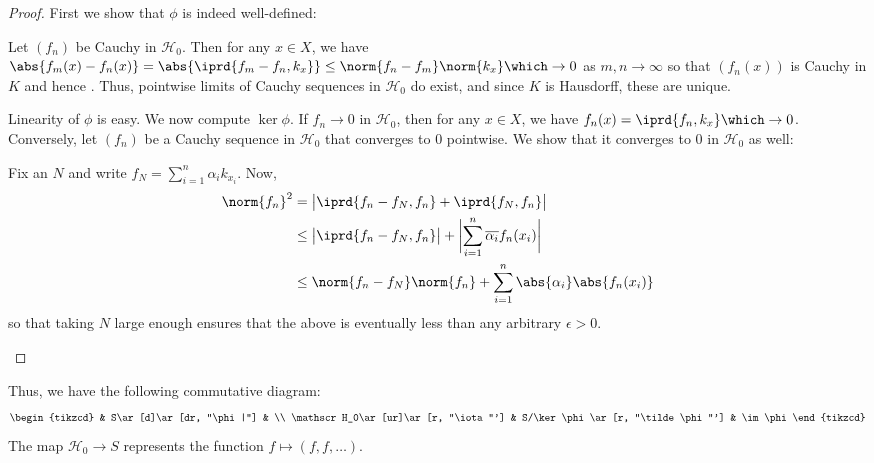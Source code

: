 	\begin{proof}
		First we show that $\phi$ is indeed well-defined:
		\begin{subproof}
			Let $(f_n)$ be Cauchy in $\mathscr H_0$. Then for any $x\in X$, we have $\abs{ f_m(x) - f_n(x) } = \abs{\iprd{f_m - f_n, k_x}}\le \norm{f_n - f_m}\norm{k_x} \which\to 0$ as $m, n\to \infty$ so that $(f_n(x))$ is Cauchy in $K$ and hence \cgt. Thus, pointwise limits of Cauchy sequences in $\mathscr H_0$ do exist, and since $K$ is Hausdorff, these are unique.
		\end{subproof}
		
		Linearity of $\phi$ is easy. We now compute $\ker\phi$. If $f_n\to 0$ in $\mathscr H_0$, then for any $x\in X$, we have $f_n(x) = \iprd{f_n, k_x}\which\to 0$. Conversely, let $(f_n)$ be a Cauchy sequence in $\mathscr H_0$ that converges to $0$ pointwise. We show that it converges to $0$ in $\mathscr H_0$ as well:
		\begin{subproof}
			Fix an $N$ and write $f_N = \sum_{i = 1}^n \alpha_i k_{x_i}$. Now, 
			\begin{align*}
				\norm{f_n}^2 
				& = \bigl| \iprd{f_n - f_N, f_n} + \iprd{f_N, f_n}\bigr| \\
				& \le \bigl| \iprd{f_n - f_N, f_n} \bigr| + \biggl|\sum_{i = 1}^n \overline{\alpha_i} f_n(x_i)\biggr|\\
				& \le \norm{f_n - f_N}\norm{f_n} + \sum_{i = 1}^n \abs{\alpha_i}\abs{f_n(x_i)}
			\end{align*}
			so that taking $N$ large enough ensures that the above is eventually less than any arbitrary $\epsilon > 0$.\qedhere
		\end{subproof}
	\end{proof}
	
	Thus, we have the following commutative diagram:
	\[
	\begin{tikzcd}
		& S\ar[d]\ar[dr, "\phi|"] & \\
		\mathscr H_0\ar[ur]\ar[r, "\iota"'] & S/\ker\phi\ar[r, "\tilde\phi"'] & \im\phi
	\end{tikzcd}
	\]
	The map $\mathscr H_0\to S$ represents the function $f\mapsto (f, f, \ldots)$.
	
